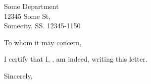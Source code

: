 \documentclass{letter}
\begin{document}
\begin{letter}{Some Department\\
12345 Some St,\\
Somecity, SS. 12345-1150}

\opening{To whom it may concern,}

I certify that I, \fromname, am indeed, writing this letter.

\closing{Sincerely,}

\end{letter}
\end{document}
